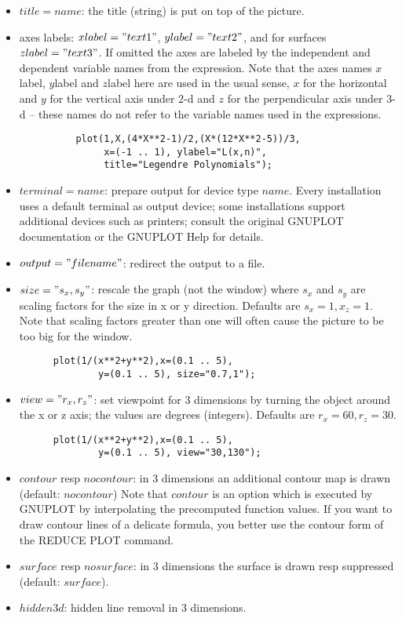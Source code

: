 \begin{itemize}
\item $title=name$: the title (string) is put on top
     of the picture. 

\item axes labels: $xlabel="text1"$, $ylabel="text2"$, and for
  surfaces $zlabel="text3"$. If omitted the axes are labeled
  by the independent and dependent variable names from the
  expression. Note that the axes names $x$label, $y$label and
  $z$label here are used in the usual sense, $x$ for the 
  horizontal and $y$ for the vertical axis under 2-d and
  $z$ for the perpendicular axis under 3-d -- these names
  do not refer to the variable names used in the expressions.

\begin{verbatim}
          plot(1,X,(4*X**2-1)/2,(X*(12*X**2-5))/3,
               x=(-1 .. 1), ylabel="L(x,n)",
               title="Legendre Polynomials");
\end{verbatim}

\item $terminal=name$: prepare output for device type $name$.
     Every installation uses a default terminal as output
     device; some installations support additional
     devices such as printers; consult the original
     GNUPLOT documentation or the GNUPLOT Help for details.
\item $output="filename"$: redirect the output to a file.

\item $size="s_x,s_y"$: rescale the graph (not the
      window) where $s_x$ and $s_y$ are scaling
     factors for the size in x or y
     direction. Defaults are $s_x=1,x_z=1$.
     Note that scaling factors greater than one
     will often cause the picture to be too big for
     the window.
\begin{verbatim}
      plot(1/(x**2+y**2),x=(0.1 .. 5),
              y=(0.1 .. 5), size="0.7,1");
\end{verbatim}
\item $view="r_x,r_z"$: set viewpoint for 3 dimensions 
     by turning the object around the x or z axis;
     the values are degrees (integers).
Defaults are $r_x=60,r_z=30$.
\begin{verbatim}
      plot(1/(x**2+y**2),x=(0.1 .. 5),
              y=(0.1 .. 5), view="30,130");
\end{verbatim}
\item  $contour$ resp $nocontour$: in 3 dimensions an 
       additional contour map is drawn (default: $nocontour$)
       Note that $contour$ is an option
       which is executed by GNUPLOT by interpolating the precomputed
       function values. If you want to draw contour lines of a 
       delicate formula, you better use the contour form of the
       REDUCE PLOT command.
\item $surface$ resp $nosurface$: in 3 dimensions the
       surface is drawn resp suppressed (default: $surface$).
\item $hidden3d$: hidden line removal in 3 dimensions.
\end{itemize}


